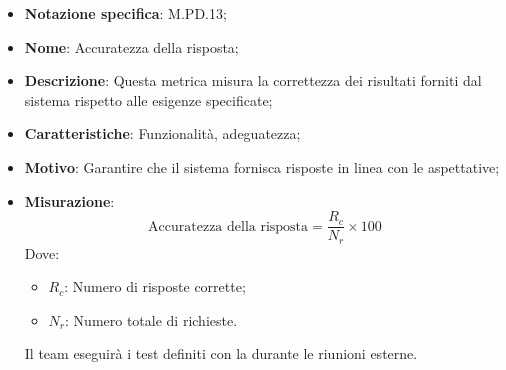 \begin{itemize}
    \item \textbf{Notazione specifica}: M.PD.13;
    \item \textbf{Nome}: Accuratezza della risposta;
    \item \textbf{Descrizione}: Questa metrica misura la correttezza dei risultati forniti dal sistema rispetto alle esigenze specificate;
    \item \textbf{Caratteristiche}: Funzionalità, adeguatezza;
    \item \textbf{Motivo}: Garantire che il sistema fornisca risposte in linea con le aspettative;
    \item \textbf{Misurazione}:
    \[
    \text{Accuratezza della risposta} = \frac{R_{c}}{N_{r}} \times 100
    \]
    Dove:
    \begin{itemize}
        \item $R_{c}$: Numero di risposte corrette;
        \item $N_{r}$: Numero totale di richieste.
    \end{itemize}

    \vspace{0.5\baselineskip}
    \par Il team eseguirà i test definiti con la  durante le riunioni esterne.
 \end{itemize}
